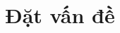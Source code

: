 \documentclass[../DoAn.tex]{subfiles}
\begin{document}
\section{Đặt vấn đề}
\label{section:1.1}



\end{document}
